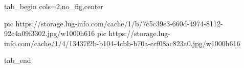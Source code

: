  
 
 
 
 


\ifcmt
  tab_begin cols=2,no_fig,center

     pic https://storage.lug-info.com/cache/1/b/7c5c39e3-660d-4974-8112-92c4a09f3302.jpg/w1000h616%
		 pic https://storage.lug-info.com/cache/1/4/13437f2b-b104-4cbb-b70a-ccf08ac823a0.jpg/w1000h616%

  tab_end
\fi
